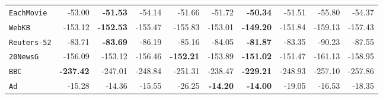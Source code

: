 \documentclass[xcolor={usenames,dvipsnames,svgnames}, compress]{beamer}
\begin{document}
\begin{frame}[t]
\begin{table}[t]
\begin{tabular}{l r r r r  r | r r r r}
    \texttt{EachMovie}  & -53.00                               & \textbf{-51.53}                                & -54.14                 & -51.66  & -51.72  &\cellcolor{lacamlilac}\color{white} \textbf{-50.34}  & -51.51         & -55.80          & -54.37          \\ 
    \texttt{WebKB}      & -153.12                              & \textbf{-152.53}                               & -155.47                & -155.83 & -153.01 &\cellcolor{lacamlilac}\color{white} \textbf{-149.20} & -151.84        & -159.13         & -157.43         \\ 
    \texttt{Reuters-52} & -83.71                               & \textbf{-83.69}                                & -86.19                 & -85.16  & -84.05  &\cellcolor{lacamlilac}\color{white} \textbf{-81.87}  & -83.35         & -90.23          & -87.55          \\ 
    \texttt{20NewsG}    & -156.09                              & -153.12                               & -156.46                & \textbf{-152.21} & -153.89 &\cellcolor{lacamlilac}\color{white} \textbf{-151.02} & -151.47        & -161.13         & -158.95         \\ 
    \texttt{BBC}        & \textbf{-237.42}                              & -247.01                               & -248.84                & -251.31 & -238.47 &\cellcolor{lacamlilac}\color{white} \textbf{-229.21} & -248.93        & -257.10         & -257.86         \\ 
    \texttt{Ad}         & -15.28                               & -14.36                                & -15.55                 & -26.25  & \cellcolor{lacamlilac}\color{white}\textbf{-14.20}  &\cellcolor{lacamlilac}\color{white} \textbf{-14.00}  & -19.05         & -16.53          & -18.35          \\ 
    \bottomrule
  \end{tabular}
  \label{tab:ll-ens}
\end{table}
\hspace{50pt}%
\end{frame}
\end{document}
